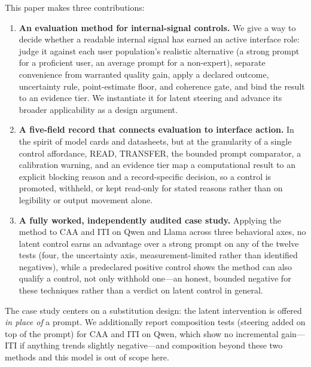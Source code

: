\documentclass[manuscript,review,anonymous]{acmart}
\providecommand{\tightlist}{%
  \setlength{\itemsep}{0pt}\setlength{\parskip}{0pt}}
\begin{document}


This paper makes three contributions:

\begin{enumerate}
\def\labelenumi{\arabic{enumi}.}
\tightlist
\item
  \textbf{An evaluation method for internal-signal controls.} We give a way to decide whether a readable internal signal has earned an active interface role: judge it against each user population's realistic alternative (a strong prompt for a proficient user, an average prompt for a non-expert), separate convenience from warranted quality gain, apply a declared outcome, uncertainty rule, point-estimate floor, and coherence gate, and bind the result to an evidence tier. We instantiate it for latent steering and advance its broader applicability as a design argument.
\item
  \textbf{A five-field record that connects evaluation to interface action.} In the spirit of model cards and datasheets, but at the granularity of a single control affordance, READ, TRANSFER, the bounded prompt comparator, a calibration warning, and an evidence tier map a computational result to an explicit blocking reason and a record-specific decision, so a control is promoted, withheld, or kept read-only for stated reasons rather than on legibility or output movement alone.
\item
  \textbf{A fully worked, independently audited case study.} Applying the method to CAA and ITI on Qwen and Llama across three behavioral axes, no latent control earns an advantage over a strong prompt on any of the twelve tests (four, the uncertainty axis, measurement-limited rather than identified negatives), while a predeclared positive control shows the method can also qualify a control, not only withhold one---an honest, bounded negative for these techniques rather than a verdict on latent control in general.
\end{enumerate}

The case study centers on a substitution design: the latent intervention is offered \emph{in place of} a prompt. We additionally report composition tests (steering added on top of the prompt) for CAA and ITI on Qwen, which show no incremental gain---ITI if anything trends slightly negative---and composition beyond these two methods and this model is out of scope here.
\end{document}
